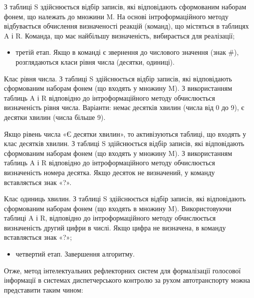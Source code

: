 З таблиці S здійснюється відбір записів, які відповідають сформованим наборам фонем, що належать до множини M.
На основі інтроформаційного методу відбувається обчислення визначеності реакцій (команд), що містяться в таблицях A і R. Команда, що має найбільшу визначеність, вибирається для реалізації;

\begin{itemize}
	\item третій етап. Якщо в команді є звернення до числового значення (знак \#), розглядаються класи рівня числа (десятки, одиниці).
\end{itemize}

Клас рівня числа. З таблиці S здійснюється відбір записів, які відповідають сформованим наборам фонем (що входять у множину M). З використанням таблиць A і R відповідно до інтроформаційного методу обчислюється визначеність рівня числа. Варіанти: немає десятків хвилин (числа від 0 до 9), є десятки хвилин (числа більше 9).

Якщо рівень числа «Є десятки хвилин», то активізуються таблиці, що входять у клас десятків хвилин. З таблиці S здійснюється відбір записів, які відповідають сформованим наборам фонем (що входять у множину M). З використанням таблиць A і R відповідно до інтроформаційного методу обчислюється визначеність номера десятка. Якщо десяток не визначений, у команду вставляється знак «?».

Клас одиниць хвилин. З таблиці S здійснюється відбір записів, які відповідають сформованим наборам фонем (що входять в множину M). Використовуючи таблиці A і R, відповідно до інтроформаційного методу обчислюється визначеність другий цифри в числі. Якщо цифра не визначена, в команду вставляється знак «?»;

\begin{itemize}
	\item четвертий етап. Завершення алгоритму.
\end{itemize}

Отже, метод інтелектуальних рефлекторних систем для формалізації голосової інформації в системах диспетчерського контролю за рухом автотранспорту можна представити таким чином:

